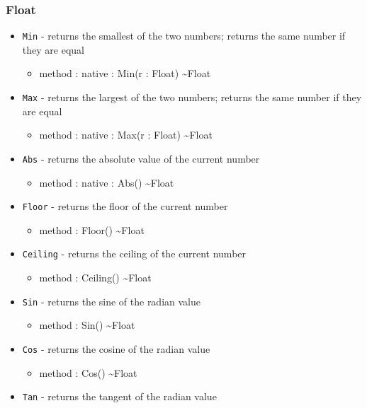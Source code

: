\documentclass[11pt]{article}
\begin{document}
\subsubsection{Float}
\begin{itemize}
\item \texttt{Min} - returns the smallest of the two numbers; returns
  the same number if they are equal
  \begin{itemize}
  \item method : native : Min(r : Float) \textasciitilde Float
  \end{itemize}
\item \texttt{Max} - returns the largest of the two numbers; returns
  the same number if they are equal
  \begin{itemize}
  \item method : native : Max(r : Float) \textasciitilde Float
  \end{itemize}
\item \texttt{Abs} - returns the absolute value of the current number
  \begin{itemize}
  \item method : native : Abs() \textasciitilde Float
  \end{itemize}
\item \texttt{Floor} - returns the floor of the current number
  \begin{itemize}
  \item method : Floor() \textasciitilde Float
  \end{itemize}
\item \texttt{Ceiling} - returns the ceiling of the current number
  \begin{itemize}
  \item method : Ceiling() \textasciitilde Float
  \end{itemize}
\item \texttt{Sin} - returns the sine of the radian value
  \begin{itemize}
  \item method : Sin() \textasciitilde Float
  \end{itemize}
\item \texttt{Cos} - returns the cosine of the radian value
  \begin{itemize}
  \item method : Cos() \textasciitilde Float
  \end{itemize}
\item \texttt{Tan} - returns the tangent of the radian value
  \begin{itemize}

\end{itemize}
\end{itemize}
\end{document}
